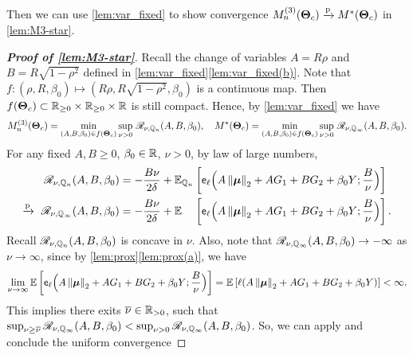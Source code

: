 Then we can use \cref{lem:var_fixed} to show convergence $M_n^{(3)}(\text{\boldmath $\Theta$}_{c}) \xrightarrow{\mathrm{p}} M^{*}(\text{\boldmath $\Theta$}_{c})$ in \cref{lem:M3-star}.
\begin{proof}[\textbf{Proof of \cref{lem:M3-star}}]
    Recall the change of variables $A = R \rho$ and $B = R \sqrt{1 - \rho^2}$ defined in \cref{lem:var_fixed}\ref{lem:var_fixed(b)}.
    Note that $f: (\rho, R, \beta_0) \mapsto (R \rho, R \sqrt{1 - \rho^2}, \beta_0)$ is a continuous map. Then $f(\text{\boldmath $\Theta$}_{c}) \subset \mathbb{R}_{\ge 0} \times \mathbb{R}_{\ge 0} \times \mathbb{R}$ is still compact. Hence, by \cref{lem:var_fixed} we have
    \begin{equation*}
        M_n^{(3)}(\text{\boldmath $\Theta$}_{c}) =
        \min_{ (A, B, \beta_0) \in f(\text{\boldmath $\Theta$}_{c}) } \sup_{\nu > 0} \,
        \mathscr{R}_{\nu, \mathbb{Q}_n}(A, B, \beta_0),
        \quad
        M^*(\text{\boldmath $\Theta$}_{c}) =
        \min_{ (A, B, \beta_0) \in f(\text{\boldmath $\Theta$}_{c}) } \sup_{\nu > 0} \,
        \mathscr{R}_{\nu, \mathbb{Q}_\infty}(A, B, \beta_0).
    \end{equation*}
    For any fixed $A, B \ge 0$, $\beta_0 \in \mathbb{R}$, $\nu > 0$, by law of large numbers,
    \begin{align*}
        \mathscr{R}_{\nu, \Q_n}(A, B, \beta_0) 
        & = - \frac{B \nu}{2 \delta }
        +
        \E_{\Q_n} \left[ \envelope_{\ell} \Bigl( A \norm{\vmu}_2 + A G_1 + B G_2 + \beta_0 Y ; \frac{B}{\nu} \Bigr) \right] \\
        \conp \ \mathscr{R}_{\nu, \Q_\infty}(A, B, \beta_0)
        & = - \frac{B \nu}{2 \delta }
        +
        \E_{\phantom{\Q_n}} \left[ \envelope_{\ell} \Bigl( A \norm{\vmu}_2 + A G_1 + B G_2 + \beta_0 Y ; \frac{B}{\nu} \Bigr) \right]. 
    \end{align*}
    Recall $\mathscr{R}_{\nu, \mathbb{Q}_n}(A, B, \beta_0)$ is concave in $\nu$. Also, note that $\mathscr{R}_{\nu, \mathbb{Q}_\infty}(A, B, \beta_0) \to -\infty$ as $\nu \to \infty$, since by \cref{lem:prox}\ref{lem:prox(a)}, we have
    \begin{equation*}
        \lim_{\nu \to \infty} \mathbb{E} \left[ \mathsf{e}_{\ell} \Bigl( A \left\|{{\boldsymbol{\mu}}}\right\|_2 + A G_1 + B G_2 + \beta_0 Y ; \frac{B}{\nu} \Bigr) \right]
        = \mathbb{E} \left[ \ell ( A \left\|{{\boldsymbol{\mu}}}\right\|_2 + A G_1 + B G_2 + \beta_0 Y ) \right] < \infty.
    \end{equation*}
    This implies there exits $\overline{\nu} \in \mathbb{R}_{> 0}$, such that $\sup_{\nu \ge \overline{\nu}} \mathscr{R}_{\nu, \mathbb{Q}_\infty}(A, B, \beta_0) < \sup_{\nu > 0} \mathscr{R}_{\nu, \mathbb{Q}_\infty}(A, B, \beta_0)$. So, we can apply \cite[Lemma 10]{thrampoulidis2018precise} and conclude the uniform convergence

\end{proof}
